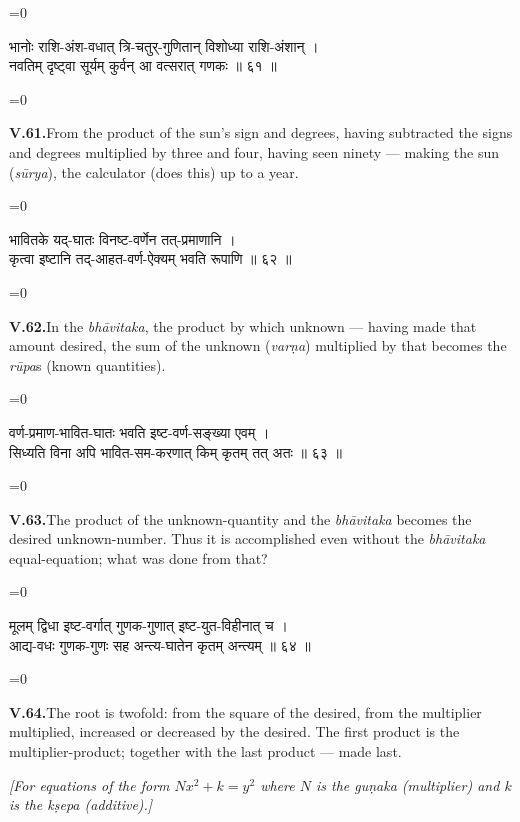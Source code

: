 \documentclass[11pt,a4paper]{article}
\newcommand{\dev}[1]{{\devanagarifont\color{sktcolor}#1}}
\newcommand{\iast}[1]{\textit{#1}}
\newenvironment{paracol}[1]{\begingroup}{\endgroup}
\newcommand{\switchcolumn}[1][]{%
  \ifnum#1=0\relax\else\par\nobreak\vspace{0.5em}\par\nobreak\fi%
}
\begin{document}
\begin{paracol}{2}
\switchcolumn[0]
\dev{%
भानोः राशि-अंश-वधात् त्रि-चतुर्-गुणितान् विशोध्या राशि-अंशान् ।\\
नवतिम् दृष्ट्वा सूर्यम् कुर्वन् आ वत्सरात् गणकः ॥ ६१ ॥
}

\switchcolumn[1]
\textbf{V.61.}\quad From the product of the sun's sign and degrees,
having subtracted the signs and degrees multiplied by three and four,
having seen ninety — making the sun (\iast{sūrya}), the calculator
(does this) up to a year.
\end{paracol}

\vspace{0.3cm}

\begin{paracol}{2}
\switchcolumn[0]
\dev{%
भावितके यद्-घातः विनष्ट-वर्णेन तत्-प्रमाणानि ।\\
कृत्वा इष्टानि तद्-आहत-वर्ण-ऐक्यम् भवति रूपाणि ॥ ६२ ॥
}

\switchcolumn[1]
\textbf{V.62.}\quad In the \iast{bhāvitaka}, the product by which
unknown — having made that amount desired, the sum of the unknown
(\iast{varṇa}) multiplied by that becomes the \iast{rūpa}s (known
quantities).
\end{paracol}

\vspace{0.3cm}

\begin{paracol}{2}
\switchcolumn[0]
\dev{%
वर्ण-प्रमाण-भावित-घातः भवति इष्ट-वर्ण-सङ्ख्या एवम् ।\\
सिध्यति विना अपि भावित-सम-करणात् किम् कृतम् तत् अतः ॥ ६३ ॥
}

\switchcolumn[1]
\textbf{V.63.}\quad The product of the unknown-quantity and the
\iast{bhāvitaka} becomes the desired unknown-number. Thus it is
accomplished even without the \iast{bhāvitaka} equal-equation;
what was done from that?
\end{paracol}

\vspace{0.3cm}

\begin{paracol}{2}
\switchcolumn[0]
\dev{%
मूलम् द्विधा इष्ट-वर्गात् गुणक-गुणात् इष्ट-युत-विहीनात् च ।\\
आद्य-वधः गुणक-गुणः सह अन्त्य-घातेन कृतम् अन्त्यम् ॥ ६४ ॥
}

\switchcolumn[1]
\textbf{V.64.}\quad The root is twofold: from the square of the
desired, from the multiplier multiplied, increased or decreased by
the desired. The first product is the multiplier-product; together
with the last product — made last.

\medskip
\textit{[For equations of the form $N x^2 + k = y^2$ where $N$ is the
\iast{guṇaka} (multiplier) and $k$ is the \iast{kṣepa} (additive).]}
\end{paracol}
\end{document}
